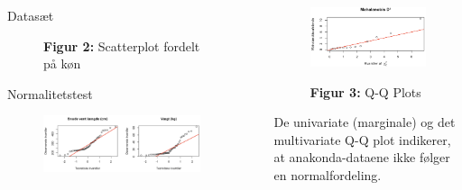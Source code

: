 \documentclass[final]{beamer}
\newlength{\sepwidth}
\newlength{\colwidth}
\newcommand{\separatorcolumn}{\begin{column}{\sepwidth}\end{column}}
\begin{document}
\begin{frame}[t]
\begin{columns}[t]
\begin{column}{\colwidth}
\begin{block}{Datasæt}
\begin{figure}[h!]
	\textbf{\textcolor{junglegreen}{Figur 2:}} Scatterplot fordelt på køn
	
	
	\end{figure}

\end{block}

  \vspace{-2em}
  \begin{block}{Normalitetstest}
    \justifying

    \begin{figure}[h!]
	\centering
	\includegraphics[width=0.95\linewidth]{plots/qq_1final.png}

	\end{figure}
	
  \end{block}

\end{column}

\separatorcolumn


\begin{column}{\colwidth}
\justifying

\begin{figure}[h!]
	\centering
	\includegraphics[width=0.75\linewidth]{plots/qq_3.png}

	\textbf{\textcolor{junglegreen}{Figur 3:}} Q-Q Plots 	
\end{figure}

De univariate (marginale) og det multivariate Q-Q plot indikerer, at anakonda-dataene ikke følger en normalfordeling.
\vspace{1em}


\end{column}
\end{columns}
\end{frame}
\end{document}
